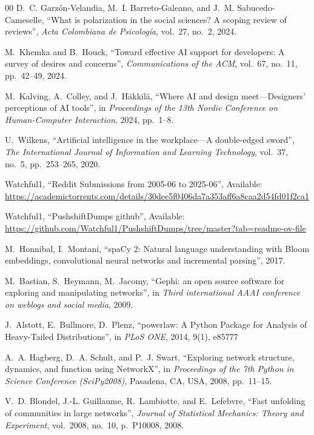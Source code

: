 \documentclass[conference]{IEEEtran}
\begin{document}
\begin{thebibliography}{00}
D.~C. Garzón-Velandia, M.~I. Barreto-Galeano, and J.~M. Sabucedo-Cameselle,
``What is polarization in the social sciences? A scoping review of reviews'',
\emph{Acta Colombiana de Psicología}, vol.~27, no.~2, 2024.

M.~Khemka and B.~Houck,
``Toward effective AI support for developers: A survey of desires and concerns'',
\emph{Communications of the ACM}, vol.~67, no.~11, pp.~42--49, 2024.

M.~Kalving, A.~Colley, and J.~Häkkilä,
``Where AI and design meet—Designers’ perceptions of AI tools'',
in \emph{Proceedings of the 13th Nordic Conference on Human-Computer Interaction}, 2024, pp.~1--8.

U.~Wilkens,
``Artificial intelligence in the workplace—A double-edged sword'',
\emph{The International Journal of Information and Learning Technology}, vol.~37, no.~5, pp.~253--265, 2020.

Watchful1,
``Reddit Submissions from 2005-06 to 2025-06'', Available: \url{https://academictorrents.com/details/30dee5f0406da7a353aff6a8caa2d54fd01f2ca1}

Watchful1,
``PushshiftDumps github'', Available: \url{https://github.com/Watchful1/PushshiftDumps/tree/master?tab=readme-ov-file}

M.~Honnibal, I.~Montani, 
``spaCy 2: Natural language understanding with Bloom embeddings, convolutional neural networks and incremental parsing'',
2017.

M.~Bastian, S.~Heymann, M.~Jacomy,
``Gephi: an open source software for exploring and manipulating networks'',
in \emph{Third international AAAI conference on weblogs and social media}, 2009.

J.~Alstott, E.~Bullmore, D.~Plenz,
``powerlaw: A Python Package for Analysis of Heavy-Tailed Distributions'',
in \emph{PLoS ONE}, 2014, 9(1), e85777

A.~A. Hagberg, D.~A. Schult, and P.~J. Swart,
``Exploring network structure, dynamics, and function using NetworkX'',
in \emph{Proceedings of the 7th Python in Science Conference (SciPy2008)},
Pasadena, CA, USA, 2008, pp.~11--15.

V.~D. Blondel, J.-L. Guillaume, R.~Lambiotte, and E.~Lefebvre,
``Fast unfolding of communities in large networks'',
\emph{Journal of Statistical Mechanics: Theory and Experiment}, vol.~2008, no.~10, p.~P10008, 2008.


\end{thebibliography}
\end{document}
